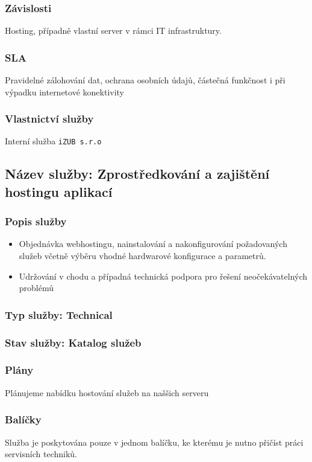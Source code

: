 \documentclass[11pt, a4paper, titlepage]{article}
\begin{document}
	\subsubsection*{Závislosti}
	Hosting, případně vlastní server v rámci IT infrastruktury.

	\subsubsection*{SLA}
	Pravidelné zálohování dat, ochrana osobních údajů, částečná funkčnost i při výpadku internetové konektivity

	\subsubsection*{Vlastnictví služby}
	Interní služba \texttt{iZUB s.r.o}

	\subsection*{Název služby: Zprostředkování a zajištění hostingu aplikací}	

	\subsubsection*{Popis služby}
	\begin{itemize}
		\item Objednávka webhostingu, nainstalování a nakonfigurování požadovaných služeb včetně výběru vhodné hardwarové konfigurace a parametrů.
		\item Udržování v chodu a případná technická podpora pro řešení neočekávatelných problémů
	\end{itemize}

	\subsubsection*{Typ služby: Technical}

	\subsubsection*{Stav služby: Katalog služeb}

	\subsubsection*{Plány}
	Plánujeme nabídku hostování služeb na naššich serveru

	\subsubsection*{Balíčky}
	Služba je poskytována pouze v jednom balíčku, ke kterému je nutno přičíst práci servisních techniků. 
\end{document}
